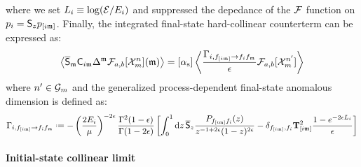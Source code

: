 where we set $ L_i \equiv \log (\mathcal{E} / E_i) $ and suppressed the depedance of the $ \mathcal{F} $ function on $ p_i = \mathsf{S}_z p_{[i\mathfrak{m}]} $. Finally, the integrated final-state hard-collinear counterterm can be expressed as:
\begin{equation}
  \left\langle \overline{\mathsf{S}}_{\mathfrak{m}} \mathsf{C}_{i\mathfrak{m}} \Delta^{\mathfrak{m}} \mathcal{F}_{a,b}[\mathcal{X}^{n}_{m}](\mathfrak{m}) \right\rangle = [\alpha_\text{s}] \left\langle \frac{\Gamma_{i,f_{[i\mathfrak{m}]} \rightarrow f_i f_{\mathfrak{m}}}}{\epsilon} \mathcal{F}_{a,b}[\mathcal{X}^{n'}_{m}] \right\rangle
  \label{eq:hc-fs}
\end{equation}
where $ n' \in \mathcal{G}_m $ and the generalized process-dependent final-state anomalous dimension is defined as:
\begin{equation}
  \Gamma_{i,f_{[i\ur]} \rightarrow f_i f_\ur} \defeq - \left( \frac{2E_i}{\mu} \right)^{-2\de} \frac{\Gamma^2(1-\de)}{\Gamma(1-2\de)} \left[ \int_0^1 \dd z\, \oso_z \frac{\spl_{f_{[i\ur]}f_i}(z)}{z^{-1+2\de} (1-z)^{2\de}} - \delta_{f_{[i\ur]},f_i} \tco^2_{[i\ur]} \frac{1 - e^{-2\de L_i}}{\de} \right]
  \label{eq:fin-gen-an-dim-pd}
\end{equation}

\paragraph{Initial-state collinear limit}

